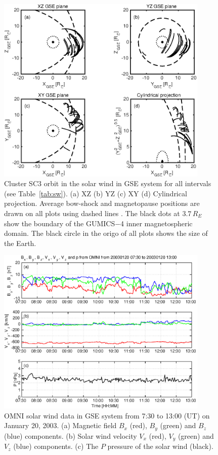 \documentclass[draft]{agujournal2019}
\begin{document}
\begin{figure}[h]
\centering
\includegraphics[width=0.9\textwidth,angle=0]{swe-2021SW002807-f01} 
\caption{Cluster SC3 orbit in the solar wind in GSE system for all intervals (see Table~\ref{tab:sw}). (a) XZ (b) YZ (c) XY (d) Cylindrical projection. Average bow-shock and magnetopause positions are drawn on all plots using dashed lines \cite[respectively]{peredo95:_three_alfven_mach,tsyganenko95:_model_earth}. The black dots at $3.7\,R_E$ show the boundary of the GUMICS$-$4 inner magnetospheric domain. The black circle in the origo of all plots shows the size of the Earth.}
\label{fig:sworbit}
\end{figure}

\pagebreak

\begin{figure}[h]
\centering
\includegraphics[width=0.9\textwidth,angle=0]{swe-2021SW002807-f02} 
\caption{OMNI solar wind data in GSE system from 7:30 to 13:00 (UT) on January 20, 2003. (a) Magnetic field $B_{x}$ (red), $B_{y}$ (green) and $B_{z}$ (blue) components. (b) Solar wind velocity $V_{x}$ (red), $V_{y}$ (green) and $V_{z}$ (blue) components. (c) The $P$ pressure of the solar wind (black).}

\label{fig:swomni}
\end{figure}
\end{document}
